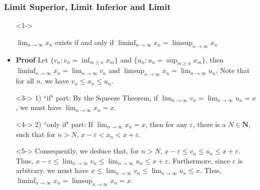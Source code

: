 \documentclass[handout]{beamer}
\begin{document}
\frame
{
  \frametitle{Limit Superior, Limit Inferior and Limit}

   \begin{itemize}
   
      \item[]<1-> \begin{Theorem}  $\lim_{n\rightarrow\infty}x_n$ exists if and only if $\liminf_{n\rightarrow \infty} x_n=\limsup_{n\rightarrow \infty} x_n$\end{Theorem} 
  \item<2-> \textbf{Proof} Let $\{v_n: v_n=\inf_{m\geq n} x_m\}$ and $\{u_n: u_n=\sup_{m\geq n} x_m\}$, then $\liminf_{n\rightarrow \infty} x_n=\lim_{n\rightarrow \infty} v_n$ and $\limsup_{n\rightarrow \infty} x_n=\lim_{n\rightarrow \infty} u_n$. Note that for all $n$, we have $v_n\leq x_n\leq u_n$.
   \item[]<3-> 1) ``if" part: By the Squeeze Theorem, \newline if $\lim_{n\rightarrow \infty} v_n=\lim_{n\rightarrow \infty} u_n=x$, we must have $\lim_{n\rightarrow\infty}x_n=x$. 
     \item[]<4-> 2) ``only if" part: If $\lim_{n\rightarrow\infty}x_n=x$, then for any $\varepsilon$, there is a $N\in \mathbf{N}$, such that for $n>N$, $x-\varepsilon<x_n<x+\varepsilon$. 
     \item[]<5-> Consequently, we deduce that, for $n>N$, $x-\varepsilon\leq v_n\leq u_n\leq x+\varepsilon$. Thus, $x-\varepsilon \leq \lim_{n\rightarrow \infty} v_n\leq \lim_{n\rightarrow \infty} u_n\leq x+\varepsilon$. Furthermore, since $\varepsilon$ is arbitrary. we must have $x\leq \lim_{n\rightarrow \infty} v_n\leq \lim_{n\rightarrow \infty} u_n\leq x$. Thus, $\liminf_{n\rightarrow \infty} x_n=\limsup_{n\rightarrow \infty} x_n=x$.
     
 
       
  \end{itemize}
}
\end{document}
